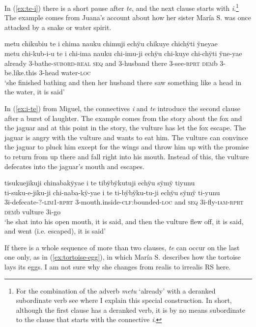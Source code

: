 In (\ref{ex:te-i}) there is a short pause after \textit{te}, and the next clause starts with \textit{i}.\footnote{For the combination of the adverb \textit{metu} ‘already’ with a deranked subordinate verb see  where I explain this special construction. In short, although the first clause has a deranked verb, it is by no means subordinate to the clause that starts with the connective \textit{i}.} The example comes from Juana’s account about how her sister María S. was once attacked by a snake or water spirit.


\ea\label{ex:te-i}
\begingl
\glpreamble metu chikubiu te i chima nauku chimuji echÿu chikuye chichÿti ÿneyae\\
\gla metu chi-kub-i-u te i chi-ima nauku chi-imu-ji echÿu chi-kuye chi-chÿti ÿne-yae\\
\glb already 3-bathe-\textsc{subord}-\textsc{real} \textsc{seq} and 3-husband there 3-see-\textsc{rprt} \textsc{dem}b 3-be.like.this 3-head water-\textsc{loc}\\
\glft ‘she finished bathing and then her husband there saw something like a head in the water, it is said’
\endgl
\trailingcitation{[jxx-p120515l-2.154-155]}
\xe

In (\ref{ex:i-te}) from Miguel, the connectives \textit{i} and \textit{te} introduce the second clause after a burst of laughter. The example comes from the story about the fox and the jaguar and at this point in the story, the vulture has let the fox escape. The jaguar is angry with the vulture and wants to eat him. The vulture can convince the jaguar to pluck him except for the wings and throw him up with the promise to return from up there and fall right into his mouth. Instead of this, the vulture defecates into the jaguar’s mouth and escapes.

\ea\label{ex:i-te}
\begingl
\glpreamble tisukuejikuji chinabakÿyae i te tibÿbÿkutuji echÿu sÿmÿ tiyunu\\
\gla ti-suku-e-jiku-ji chi-naba-kÿ-yae i te ti-bÿbÿku-tu-ji echÿu sÿmÿ ti-yunu\\
\glb 3i-defecate-?-\textsc{lim}1-\textsc{rprt} 3-mouth.inside-\textsc{clf:}bounded-\textsc{loc} and \textsc{seq} 3i-fly-\textsc{iam}-\textsc{rprt} \textsc{dem}b vulture 3i-go\\
\glft ‘he shat into his open mouth, it is said, and then the vulture flew off, it is said, and went (i.e. escaped), it is said’
\endgl
\trailingcitation{[jmx-n120429ls-x5.209-211]}
\xe

If there is a whole sequence of more than two clauses, \textit{te} can occur on the last one only, as in (\ref{ex:tortoise-egg}), in which María S. describes how the tortoise lays its eggs. I am not sure why she changes from realis to irrealis RS here.

